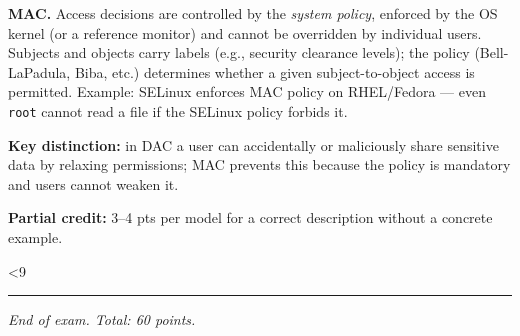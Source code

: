 \documentclass[11pt]{article}
\newcounter{writelinesi}
\newcommand{\writelines}[1]{%
  \par\vspace{4pt}%
  \setcounter{writelinesi}{0}%
  \loop\ifnum\value{writelinesi}<#1
    \par\noindent\rule{\linewidth}{0.4pt}\vspace{1.4em}%
    \stepcounter{writelinesi}%
  \repeat
  \par\vspace{4pt}}
\begin{document}
\begin{enumerate}[resume]
    \textbf{MAC.}  Access decisions are controlled by the \emph{system policy},
    enforced by the OS kernel (or a reference monitor) and cannot be overridden by
    individual users.  Subjects and objects carry labels (e.g., security clearance
    levels); the policy (Bell-LaPadula, Biba, etc.) determines whether a given
    subject-to-object access is permitted.  Example: SELinux enforces MAC policy
    on RHEL/Fedora — even \texttt{root} cannot read a file if the SELinux policy
    forbids it.

    \textbf{Key distinction:} in DAC a user can accidentally or maliciously share
    sensitive data by relaxing permissions; MAC prevents this because the policy is
    mandatory and users cannot weaken it.

    \textbf{Partial credit:} 3--4 pts per model for a correct description without
    a concrete example.
    \par\smallskip
  \else
    \writelines{9}
  \fi

\end{enumerate}

\par\vfill
\begin{center}\small\textit{End of exam. \quad Total: 60 points.}\end{center}
\end{document}
